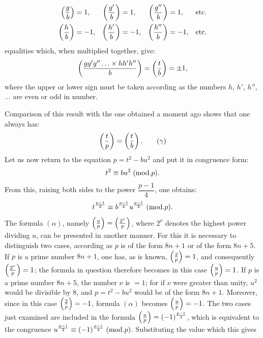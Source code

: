 \[
\begin{aligned}
\left(\frac{g}{b}\right)&=1, &\left(\frac{g'}{b}\right)&=1, &\left(\frac{g''}{b}\right)&=1, &\text{etc.}\\
\left(\frac{h}{b}\right)&=-1, &\left(\frac{h'}{b}\right)&=-1, &\left(\frac{h''}{b}\right)&=-1, &\text{etc.}
\end{aligned}
\]
equalities which, when multiplied together, give:
\[
\left(\frac{gg'g''\ldots\times hh'h''}{b}\right)=\left(\frac{t}{b}\right)=\pm1,
\]
where the upper or lower sign must be taken according as the numbers $h$,
$h'$, $h''$, $\ldots$ are even or odd in number.
\par\indent
Comparison of this result with the one obtained a moment ago shows that
one always has:
\begin{equation*}
\left(\frac{t}{p}\right)=\left(\frac{t}{b}\right).\tag{$\gamma$}
\end{equation*}
Let us now return to the equation $p=t^2-bu^2$ and put it in congruence form:
\[
t^2\equiv bu^2\;(\mathrm{mod}.p).
\]
From this, raising both sides to the power $\dfrac{p-1}{4}$, one obtains:
\[
t^{\frac{p-1}{2}}\equiv b^{\frac{p-1}{4}}u^{\frac{p-1}{2}}\;(\mathrm{mod}.p).
\]
The formula $(\alpha)$, namely $\left(\frac{u}{p}\right)=\left(\frac{2^\nu}{p}\right)$, where $2^\nu$ denotes the
highest power dividing $u$, can be presented in another manner. For this it
is necessary to distinguish two cases, according as $p$ is of the form $8n+1$
or of the form $8n+5$. If $p$ is a prime number $8n+1$, one has, as is known,
$\left(\frac{2}{p}\right)=1$, and consequently $\left(\frac{2^\nu}{p}\right)=1$; the formula in question
therefore becomes in this case $\left(\frac{u}{p}\right)=1$. If $p$ is a prime number $8n+5$,
the number $\nu$ is $=1$; for if $\nu$ were greater than unity, $u^2$ would be divisible
by $8$, and $p=t^2-bu^2$ would be of the form $8n+1$. Moreover, since in this
case $\left(\frac{2}{p}\right)=-1$, formula $(\alpha)$ becomes $\left(\frac{u}{p}\right)=-1$. The two cases
just examined are included in the formula $\left(\frac{u}{p}\right)=(-1)^{\frac{p-1}{4}}$, which
is equivalent to the congruence $u^{\frac{p-1}{2}}\equiv(-1)^{\frac{p-1}{4}}\;(\mathrm{mod}.p)$.
Substituting the value which this gives
